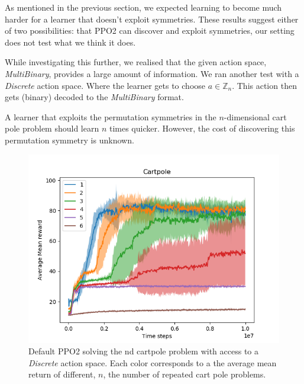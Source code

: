 As mentioned in the previous section, we expected learning to become much
harder for a learner that doesn't exploit symmetries. These results suggest either of two possibilities:
that PPO2 can discover and exploit symmetries, our setting does not test what we think it does.

While investigating this further, we realised that the given action space, \textit{MultiBinary}, provides a large amount of information. We ran another test with a \textit{Discrete} action space. Where the learner gets to choose $a\in \mathbb Z_n$.
This action then gets (binary) decoded to the \textit{MultiBinary} format.

A learner that exploits the permutation symmetries in the $n$-dimensional cart pole problem should learn $n$ times quicker.
However, the cost of discovering this permutation symmetry is unknown.

\begin{figure}[h!]
\centering
\includegraphics[width=1\textwidth,height=0.5\textheight]{../../pictures/figures/discrete-nd-cart.png}
\caption{Default PPO2 solving the nd cartpole problem with access to a \textit{Discrete} action space. Each color corresponds to a the average mean return of different, $n$, the number of repeated cart pole problems.}
\end{figure}




